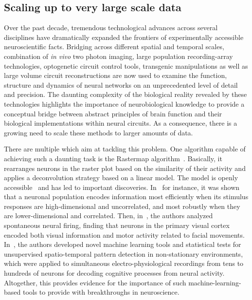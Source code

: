 \documentclass[brainsci, %
               review,submit,pdftex,moreauthors
               ]{Definitions/mdpi}
\begin{document}
\subsection{Scaling up to very large scale data}
Over the past decade, tremendous technological advances across several disciplines have dramatically expanded the frontiers of experimentally accessible neuroscientific facts. Bridging across different spatial and temporal scales, combination of \emph{in vivo} two photon imaging, large population recording-array technologies, optogenetic circuit control tools, transgenic manipulations as well as large volume circuit reconstructions are now used to examine the function, structure and dynamics of neural networks on an unprecedented level of detail and precision. The daunting complexity of the biological reality revealed by these technologies highlights the importance of neurobiological knowledge to provide a conceptual bridge between abstract principles of brain function and their biological implementations within neural circuits. As a consequence, there is a growing need to scale these methods to larger amounts of data. 

There are multiple  which aim at tackling this problem. One algorithm capable of achieving such a daunting task is the Rastermap algorithm~\citep{pachitariu_robustness_2018}. Basically, it rearranges neurons in the raster plot based on the similarity of their activity and applies a deconvolution strategy based on a linear model.  The model is openly accessible~\citep{stringer_mouselandrastermap_2020} and has led to important discoveries. In~\citep{stringer_spontaneous_2019} for instance, it was shown that a neuronal population encodes information most efficiently when its stimulus responses are high-dimensional and uncorrelated, and most robustly when they are lower-dimensional and correlated. Then, in~\citep{stringer_high-precision_2021}, the authors analyzed spontaneous neural firing, finding that neurons in the primary visual cortex encoded both visual information and motor activity related to facial movements. In~\citep{russo_cell_2017}, the authors developed novel machine learning tools and statistical tests for unsupervised spatio-temporal pattern detection in non-stationary environments, which were applied to simultaneous electro-physiological recordings from tens to hundreds of neurons for decoding cognitive processes from neural activity. Altogether, this provides evidence for the importance of such machine-learning-based tools to provide with breakthroughs in neuroscience.
\end{document}
